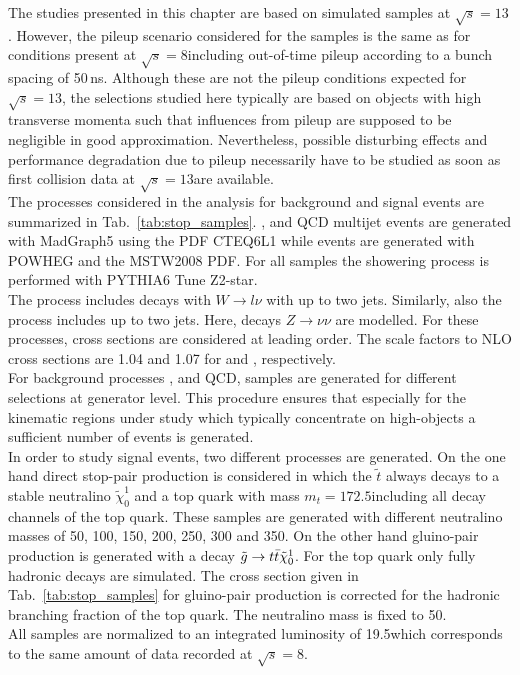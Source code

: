 The studies presented in this chapter are based on simulated samples at $\sqrt{s} = 13$\tev. However, the pileup scenario considered for the samples is the same as for conditions present at $\sqrt{s} = 8$\tev including out-of-time pileup according to a bunch spacing of 50\,ns. Although these are not the pileup conditions expected for $\sqrt{s} = 13$\tev, the selections studied here typically are based on objects with high transverse momenta such that influences from pileup are supposed to be negligible in good approximation. Nevertheless, possible disturbing effects and performance degradation due to pileup necessarily have to be studied as soon as first collision data at $\sqrt{s} = 13$\tev are available. \\
The processes considered in the analysis for background and signal events are summarized in Tab.~\ref{tab:stop_samples}. \WJets, \ZJets and QCD multijet events are generated with MadGraph5 using the PDF CTEQ6L1 while \ttbar events are generated with POWHEG and the MSTW2008 PDF. For all samples the showering process is performed with PYTHIA6 Tune Z2-star. \\
The process \WJets includes decays with $W \rightarrow l \nu$ with up to two jets. Similarly, also the process \ZJets includes up to two jets. Here, decays $Z \rightarrow \nu \nu$ are modelled. For these processes, cross sections are considered at leading order. The scale factors to NLO cross sections are 1.04 and 1.07 for \WJets and \ZJets, respectively. \\
For background processes \WJets, \ZJets and QCD, samples are generated for different \HT selections at generator level. This procedure ensures that especially for the kinematic regions under study which typically concentrate on high-\pt objects a sufficient number of events is generated. \\
In order to study signal events, two different processes are generated. On the one hand direct stop-pair production is considered in which the $\tilde{t}$ always decays to a stable neutralino $\tilde{\chi}_{0}^{1}$ and a top quark with mass $m_{t} = 172.5$\gev including all decay channels of the top quark. These samples are generated with different neutralino masses of 50, 100, 150, 200, 250, 300 and 350\gev. On the other hand gluino-pair production is generated with a decay $\tilde{g} \rightarrow t\bar{t} \tilde{\chi}_{0}^{1}$. For the top quark only fully hadronic decays are simulated. The cross section given in Tab.~\ref{tab:stop_samples} for gluino-pair production is corrected for the hadronic branching fraction of the top quark. The neutralino mass is fixed to 50\gev. \\
All samples are normalized to an integrated luminosity of 19.5\fbinv which corresponds to the same amount of data recorded at $\sqrt{s} =8$\tev.

